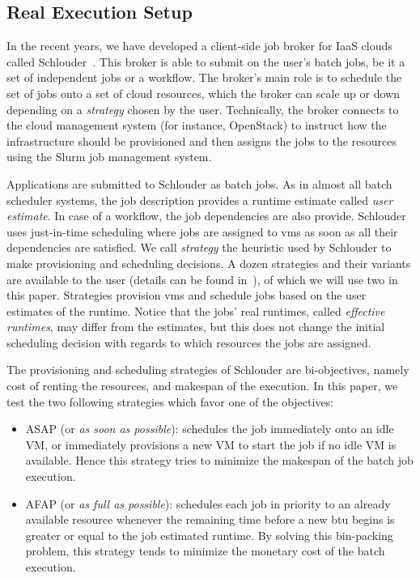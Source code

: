 \documentclass[10pt,conference,compsocconf]{IEEEtran}
\begin{document}
\subsection{Real Execution Setup}
In the recent years, we have developed  a client-side job broker for IaaS clouds
called Schlouder~\cite{Michon17}.  This broker is  able to submit on  the user's
batch jobs, be  it a set of  independent jobs or a workflow.   The broker's main
role is  to schedule the set  of jobs onto a  set of cloud resources,  which the
broker can scale up  or down depending on a \emph{strategy}  chosen by the user.
Technically, the broker  connects to the cloud management  system (for instance,
OpenStack) to  instruct how  the infrastructure should  be provisioned  and then
assigns the jobs to the resources using the Slurm job management system.

Applications are  submitted to Schlouder as  batch jobs. As in  almost all batch
scheduler  systems,  the job  description  provides  a runtime  estimate  called
\emph{user  estimate}. In  case of  a workflow,  the job  dependencies are  also
provide.   Schlouder uses  just-in-time scheduling  where jobs  are assigned  to
\acp{vm}  as   soon  as   all  their  dependencies   are  satisfied.    We  call
\emph{strategy}  the  heuristic  used  by Schlouder  to  make  provisioning  and
scheduling decisions.   A dozen strategies  and their variants are  available to
the user (details can be found in~\cite{GenaudG11}), of which we will use two in
this paper.  Strategies  provision \acp{vm} and schedule jobs based  on the user
estimates  of  the  runtime.   Notice  that  the  jobs'  real  runtimes,  called
\emph{effective  runtimes}, may  differ from  the estimates,  but this  does not
change the initial scheduling decision with  regards to which resources the jobs
are assigned.

The  provisioning  and scheduling  strategies  of  Schlouder are  bi-objectives,
namely cost  of renting the  resources, and makespan  of the execution.  In this
paper, we test the two following strategies which favor one of the objectives: 
\begin{itemize}
\item ASAP (or \textit{as soon as possible}): schedules the job immediately onto
  an idle VM, or immediately provisions a new  VM to start the job if no idle VM
  is available.  Hence this strategy tries to minimize the makespan of the batch
  job execution.

\item AFAP (or \textit{as full as  possible}): schedules each job in priority to
	an already available resource whenever the remaining time  before a new
	\ac{btu} begins is greater or equal to the job estimated runtime.
	By solving this bin-packing problem, this strategy tends to minimize the
	monetary cost of the batch execution.
\end{itemize}
\end{document}
